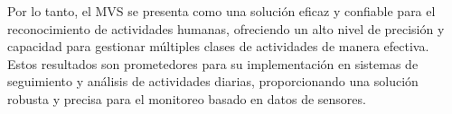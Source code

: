 \documentclass{esannV2}
\begin{document}
Por lo tanto, el MVS se presenta como una solución eficaz y confiable para el reconocimiento de actividades humanas, ofreciendo un alto nivel de precisión y capacidad para gestionar múltiples clases de actividades de manera efectiva. Estos resultados son prometedores para su implementación en sistemas de seguimiento y análisis de actividades diarias, proporcionando una solución robusta y precisa para el monitoreo basado en datos de sensores.



\begin{footnotesize}









%
%

\end{footnotesize}

\end{document}
